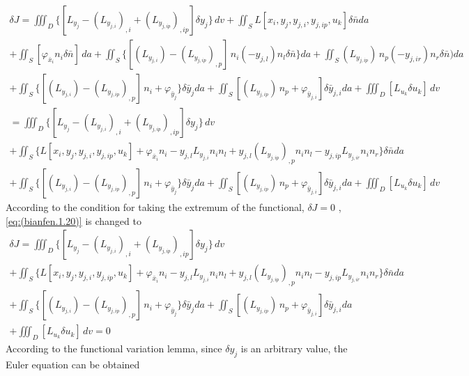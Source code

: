\begin{multline} \label{eq:(bianfen.1.20)}    
\delta J = \iiint_D \{[L_{y_j} - \left(L_{y_{j,i}}\right)_{,i}+\left(L_{y_{j,ip}}\right)_{,ip}]\delta y_j \}\,dv +\iint_S L[x_i,y_j,y_{j,i},y_{j,ip},u_k]\delta \bar{n} da
\\+ \iint_S [\varphi_{\bar {x}_i } n_i \delta \bar{n} ] \,da
+\iint_S \{[\left(L_{y_{j,i}}  \right) -\left(L_{y_{j,ip}}\right)_{,p}]\,n_i (-y_{j,l})n_l \delta \bar{n}\} da
+\iint_S \left(L_{y_{j,ip}}  \right)\,n_p (-y_{j,ir}) n_r \delta \bar{n}) da
\\+\iint_S \{[\left(L_{y_{j,i}}  \right) -\left(L_{y_{j,ip}}\right)_{,p}]\,n_i + \varphi_{\bar {y}_j } \}\delta \bar{y} _j da
+\iint_S [\left(L_{y_{j,ip}}  \right)\,n_p +\varphi_{\bar {y}_ {j,i}}] \delta \bar {y}_ {j,i} da+\iiint_D [L_{u_k} \delta u_k] \,dv
\\= \iiint_D \{[L_{y_j} - \left(L_{y_{j,i}}\right)_{,i}+\left(L_{y_{j,ip}}\right)_{, ip}]\delta y_j \}\,dv 
\\+\iint_S \{L[x_i,y_j,y_{j,i},y_{j,ip},u_k]+ \varphi_{\bar {x}_i } n_i 
-y_{j,l} L_{y_{j,i}} n_i n_l   + y_{j,l} \left(L_{y_{j,ip}}\right)_{,p} n_i n_l 
-y_{j,ip} L_{y_{j,ir}} n_i  n_r \}\delta \bar{n} da
\\+\iint_S \{[\left(L_{y_{j,i}}  \right) -\left(L_{y_{j,ip}}\right)_{,p}]\,n_i + \varphi_{\bar {y}_j } \}\delta \bar{y} _j da
+\iint_S [\left(L_{y_{j,ip}}  \right)\,n_p +\varphi_{\bar {y}_ {j,i}}] \delta \bar {y}_ {j,i} da+\iiint_D [L_{u_k} \delta u_k] \,dv
\end{multline} 
According to the condition for taking the extremum of the functional, $ \delta J=0 $ , \ref{eq:(bianfen.1.20)} is changed to
\begin{multline} \label{eq:(bianfen.1.21)}    
\delta J = \iiint_D \{[L_{y_j} - \left(L_{y_{j,i}}\right)_{,i}+\left(L_{y_{j,ip}}\right)_{, ip}]\delta y_j \}\,dv 
\\+\iint_S \{L[x_i,y_j,y_{j,i},y_{j,ip},u_k]+ \varphi_{\bar {x}_i } n_i 
-y_{j,l} L_{y_{j,i}} n_i n_l   + y_{j,l} \left(L_{y_{j,ip}}\right)_{,p} n_i n_l 
-y_{j,ip} L_{y_{j,ir}} n_i  n_r \}\delta \bar{n} da
\\+\iint_S \{[\left(L_{y_{j,i}}  \right) -\left(L_{y_{j,ip}}\right)_{,p}]\,n_i + \varphi_{\bar {y}_j } \}\delta \bar{y} _j da
+\iint_S [\left(L_{y_{j,ip}}  \right)\,n_p +\varphi_{\bar {y}_ {j,i}}] \delta \bar {y}_ {j,i} da
\\+\iiint_D [L_{u_k} \delta u_k] \,dv=0
\end{multline} 
According to the functional variation lemma, since $ \delta y_j $ is an arbitrary value, the Euler equation can be obtained
